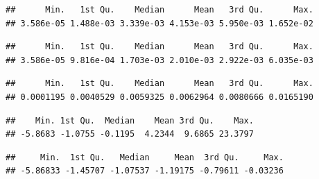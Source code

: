 \documentclass[
]{article}
\newenvironment{Shaded}{\begin{snugshade}}{\end{snugshade}}
\newcommand{\FunctionTok}[1]{\textcolor[rgb]{0.13,0.29,0.53}{\textbf{#1}}}
\newcommand{\NormalTok}[1]{#1}
\newcommand{\SpecialCharTok}[1]{\textcolor[rgb]{0.81,0.36,0.00}{\textbf{#1}}}
\begin{document}
\begin{verbatim}
##      Min.   1st Qu.    Median      Mean   3rd Qu.      Max. 
## 3.586e-05 1.488e-03 3.339e-03 4.153e-03 5.950e-03 1.652e-02
\end{verbatim}

\begin{Shaded}
\end{Shaded}

\begin{verbatim}
##      Min.   1st Qu.    Median      Mean   3rd Qu.      Max. 
## 3.586e-05 9.816e-04 1.703e-03 2.010e-03 2.922e-03 6.035e-03
\end{verbatim}

\begin{Shaded}
\end{Shaded}

\begin{verbatim}
##      Min.   1st Qu.    Median      Mean   3rd Qu.      Max. 
## 0.0001195 0.0040529 0.0059325 0.0062964 0.0080666 0.0165190
\end{verbatim}

\begin{Shaded}
\end{Shaded}

\begin{verbatim}
##    Min. 1st Qu.  Median    Mean 3rd Qu.    Max. 
## -5.8683 -1.0755 -0.1195  4.2344  9.6865 23.3797
\end{verbatim}

\begin{Shaded}
\end{Shaded}

\begin{verbatim}
##     Min.  1st Qu.   Median     Mean  3rd Qu.     Max. 
## -5.86833 -1.45707 -1.07537 -1.19175 -0.79611 -0.03236
\end{verbatim}
\end{document}
